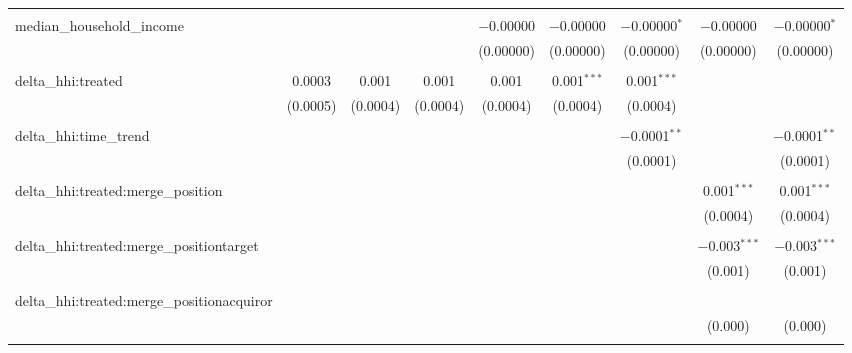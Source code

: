 \begin{table}[H]
{\begin{tabular}{@{\extracolsep{5pt}}lcccccccc}
   & & & & & & & & \\  

  median\_household\_income &  &  &  & $-$0.00000 & $-$0.00000 & $-$0.00000$^{*}$ & $-$0.00000 & $-$0.00000$^{*}$ \\  

   &  &  &  & (0.00000) & (0.00000) & (0.00000) & (0.00000) & (0.00000) \\  

   & & & & & & & & \\  

  delta\_hhi:treated & 0.0003 & 0.001 & 0.001 & 0.001 & 0.001$^{***}$ & 0.001$^{***}$ &  &  \\  

   & (0.0005) & (0.0004) & (0.0004) & (0.0004) & (0.0004) & (0.0004) &  &  \\  

   & & & & & & & & \\  

  delta\_hhi:time\_trend &  &  &  &  &  & $-$0.0001$^{**}$ &  & $-$0.0001$^{**}$ \\  

   &  &  &  &  &  & (0.0001) &  & (0.0001) \\  

   & & & & & & & & \\  

  delta\_hhi:treated:merge\_position &  &  &  &  &  &  & 0.001$^{***}$ & 0.001$^{***}$ \\  

   &  &  &  &  &  &  & (0.0004) & (0.0004) \\  

   & & & & & & & & \\  

  delta\_hhi:treated:merge\_positiontarget &  &  &  &  &  &  & $-$0.003$^{***}$ & $-$0.003$^{***}$ \\  

   &  &  &  &  &  &  & (0.001) & (0.001) \\  

   & & & & & & & & \\  

  delta\_hhi:treated:merge\_positionacquiror &  &  &  &  &  &  &  &  \\  

   &  &  &  &  &  &  & (0.000) & (0.000) \\  

   & & & & & & & & \\  


\end{tabular}}
\end{table}
